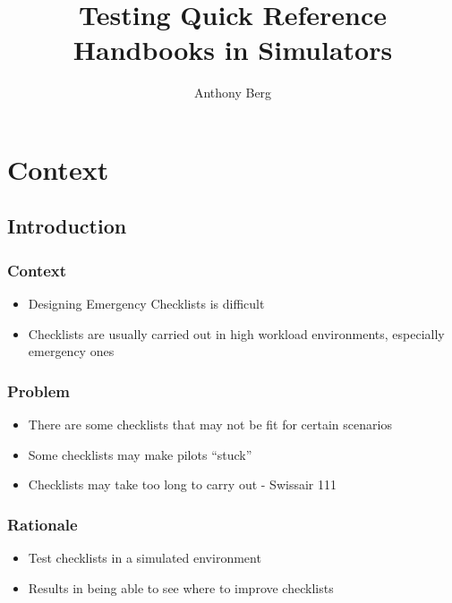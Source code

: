 \documentclass[a4paper]{article}
\author{Anthony Berg}
\title{Testing Quick Reference Handbooks in Simulators}
\begin{document}
\begin{titlepage}
    \clearpage\maketitle
    \thispagestyle{empty}
\end{titlepage}

\section{Context}
\subsection{Introduction}
\subsubsection*{Context}
\begin{itemize}
    \item Designing Emergency Checklists is difficult
    \item Checklists are usually carried out in high
        workload environments, especially emergency ones
\end{itemize}

\subsubsection*{Problem}
\begin{itemize}
    \item There are some checklists that may not be fit
        for certain scenarios
    \item Some checklists may make pilots \enquote{stuck}
    \item Checklists may take too long to carry out - Swissair 111
\end{itemize}

\subsubsection*{Rationale}
\begin{itemize}
    \item Test checklists in a simulated environment
    \item Results in being able to see where to improve checklists
\end{itemize}
\end{document}
